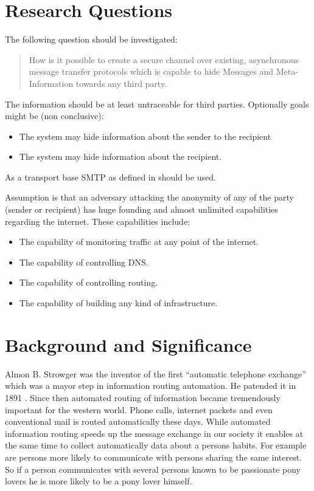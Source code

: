 \documentclass[twocolumn,a4paper]{article}
\newenvironment{myitemize}{\begin{itemize}\setlength{\itemsep}{0em}}{\end{itemize}}
\begin{document}
\section{Research Questions}
The following question should be investigated: 
\begin{quote}
How is it possible to create a secure channel over existing, asynchronous message transfer protocols which is capable to hide Messages and Meta-Information towards any third party. 
\end{quote}
The information should be at least untraceable for third parties. Optionally goals might be (non conclusive):
\begin{myitemize}
\item The system may hide information about the sender to the recipient
\item The system may hide information about the recipient. 
\end{myitemize}
As a transport base SMTP as defined in \cite{rfc5321} should be used. \par
Assumption is that an adversary attacking the anonymity of any of the party (sender or recipient) has huge founding and almost unlimited capabilities regarding the internet. These capabilities include:
\begin{myitemize}
\item The capability of monitoring traffic at any point of the internet.
\item The capability of controlling DNS.
\item The capability of controlling routing.
\item The capability of building any kind of infrastructure.
\end{myitemize}

\section{Background and Significance}
Almon B. Strowger was the inventor of the first "`automatic telephone exchange"' which was a mayor step in information routing automation. He patended it in 1891 \cite{strowger}. Since then automated routing of information became tremendously important for the western world. Phone calls, internet packets and even conventional mail is routed automatically these days. While automated information routing speeds up the message exchange in our society it enables at the same time to collect automatically data about a persons habits. For example are persons more likely to communicate with persons sharing the same interest. So if a person communicates with several persons known to be passionate pony lovers he is more likely to be a pony lover himself.\par
\end{document}

